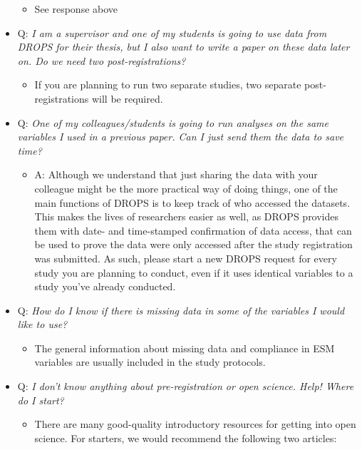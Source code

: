 \documentclass[
]{article}
\providecommand{\tightlist}{%
  \setlength{\itemsep}{0pt}\setlength{\parskip}{0pt}}
\begin{document}
\begin{itemize}
  \begin{itemize}
  \tightlist
  \item
    See response above
  \end{itemize}
\item
  Q: \emph{I am a supervisor and one of my students is going to use data
  from DROPS for their thesis, but I also want to write a paper on these
  data later on. Do we need two post-registrations?}

  \begin{itemize}
  \tightlist
  \item
    If you are planning to run two separate studies, two separate
    post-registrations will be required.
  \end{itemize}
\item
  Q: \emph{One of my colleagues/students is going to run analyses on the
  same variables I used in a previous paper. Can I just send them the
  data to save time?}

  \begin{itemize}
  \tightlist
  \item
    A: Although we understand that just sharing the data with your
    colleague might be the more practical way of doing things, one of
    the main functions of DROPS is to keep track of who accessed the
    datasets. This makes the lives of researchers easier as well, as
    DROPS provides them with date- and time-stamped confirmation of data
    access, that can be used to prove the data were only accessed after
    the study registration was submitted. As such, please start a new
    DROPS request for every study you are planning to conduct, even if
    it uses identical variables to a study you've already conducted.
  \end{itemize}
\item
  Q: \emph{How do I know if there is missing data in some of the
  variables I would like to use?}

  \begin{itemize}
  \tightlist
  \item
    The general information about missing data and compliance in ESM
    variables are usually included in the study protocols.
  \end{itemize}
\item
  Q: \emph{I don't know anything about pre-registration or open science.
  Help! Where do I start?}

  \begin{itemize}
  \tightlist
  \item
    There are many good-quality introductory resources for getting into
    open science. For starters, we would recommend the following two
    articles:


\end{itemize}
\end{itemize}
\end{document}
